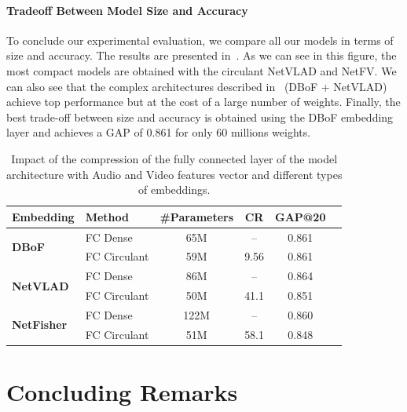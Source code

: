 \paragraph{Tradeoff Between Model Size and Accuracy}

To conclude our experimental evaluation, we compare all our models in terms of size and accuracy.
The results are presented in~. 
As we can see in this figure, the most compact models are obtained with the circulant NetVLAD and NetFV.
We can also see that the complex architectures described in~ (DBoF + NetVLAD) achieve top performance but at the cost of a large number of weights.
Finally, the best trade-off between size and accuracy is obtained using the DBoF embedding layer and achieves a GAP of 0.861 for only 60 millions weights.



\begin{table}[t]
  \centering
  \begin{tabular}{llcccc}
    \toprule
    \textbf{Embedding} & \textbf{Method} & \textbf{\#Parameters} & \textbf{CR} & \textbf{GAP@20} \\
    \midrule
    \multirow{2}{*}{\textbf{DBoF}} & FC Dense & 65M & -- & 0.861 \\
     & FC Circulant & 59M & 9.56 & 0.861 \\
    \midrule
    \multirow{2}{*}{\textbf{NetVLAD}} & FC Dense & 86M & -- & 0.864 \\
     &FC Circulant & 50M & 41.1 & 0.851 \\
    \midrule
    \multirow{2}{*}{\textbf{NetFisher}} & FC Dense & 122M & -- & 0.860 \\
     & FC Circulant & 51M & 58.1 & 0.848 \\
    \bottomrule
  \end{tabular}
  \caption{Impact of the compression of the fully connected layer of the model architecture with Audio and Video features vector and different types of embeddings.} 
  \label{table:ap2-fc_circulant_with_diff_embedding}
\end{table}




\section{Concluding Remarks}
\label{section:ap2-conclusion}

